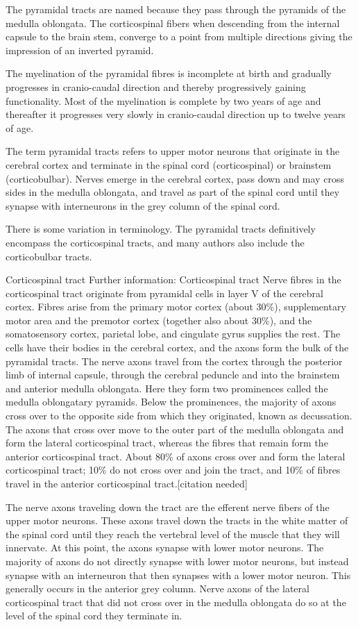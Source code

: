 \documentclass[]{book}
\begin{document}
The pyramidal tracts are named because they pass through the pyramids of the medulla oblongata. The corticospinal fibers when descending from the internal capsule to the brain stem, converge to a point from multiple directions giving the impression of an inverted pyramid.

The myelination of the pyramidal fibres is incomplete at birth and gradually progresses in cranio-caudal direction and thereby progressively gaining functionality. Most of the myelination is complete by two years of age and thereafter it progresses very slowly in cranio-caudal direction up to twelve years of age.

The term pyramidal tracts refers to upper motor neurons that originate in the cerebral cortex and terminate in the spinal cord (corticospinal) or brainstem (corticobulbar). Nerves emerge in the cerebral cortex, pass down and may cross sides in the medulla oblongata, and travel as part of the spinal cord until they synapse with interneurons in the grey column of the spinal cord.

There is some variation in terminology. The pyramidal tracts definitively encompass the corticospinal tracts, and many authors also include the corticobulbar tracts.

Corticospinal tract
Further information: Corticospinal tract
Nerve fibres in the corticospinal tract originate from pyramidal cells in layer V of the cerebral cortex. Fibres arise from the primary motor cortex (about 30\%), supplementary motor area and the premotor cortex (together also about 30\%), and the somatosensory cortex, parietal lobe, and cingulate gyrus supplies the rest. The cells have their bodies in the cerebral cortex, and the axons form the bulk of the pyramidal tracts. The nerve axons travel from the cortex through the posterior limb of internal capsule, through the cerebral peduncle and into the brainstem and anterior medulla oblongata. Here they form two prominences called the medulla oblongatary pyramids. Below the prominences, the majority of axons cross over to the opposite side from which they originated, known as decussation. The axons that cross over move to the outer part of the medulla oblongata and form the lateral corticospinal tract, whereas the fibres that remain form the anterior corticospinal tract. About 80\% of axons cross over and form the lateral corticospinal tract; 10\% do not cross over and join the tract, and 10\% of fibres travel in the anterior corticospinal tract.{[}citation needed{]}

The nerve axons traveling down the tract are the efferent nerve fibers of the upper motor neurons. These axons travel down the tracts in the white matter of the spinal cord until they reach the vertebral level of the muscle that they will innervate. At this point, the axons synapse with lower motor neurons. The majority of axons do not directly synapse with lower motor neurons, but instead synapse with an interneuron that then synapses with a lower motor neuron. This generally occurs in the anterior grey column. Nerve axons of the lateral corticospinal tract that did not cross over in the medulla oblongata do so at the level of the spinal cord they terminate in.
\end{document}
